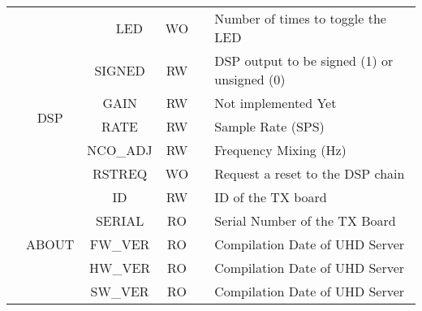 \documentclass[11pt]{article}
\begin{document}
{\begin{landscape}
\begin{table}[H]
\begin{tabular}{|c|c|c|c|c|c|l|}
                       &                         &                        & LED       & WO                &             & Number of times to toggle the LED                                     \\ \cline{2-7} 
                       & \multirow{5}{*}{DSP}    & \multicolumn{2}{c|}{SIGNED}        & RW                &             & DSP output to be signed (1) or unsigned (0)                           \\ \cline{3-7} 
                       &                         & \multicolumn{2}{c|}{GAIN}          & RW                &             & Not implemented Yet                                                   \\ \cline{3-7} 
                       &                         & \multicolumn{2}{c|}{RATE}          & RW                &             & Sample Rate (SPS)                                                     \\ \cline{3-7} 
                       &                         & \multicolumn{2}{c|}{NCO\_ADJ}      & RW                &             & Frequency Mixing (Hz)                                                 \\ \cline{3-7} 
                       &                         & \multicolumn{2}{c|}{RSTREQ}        & WO                &             & Request a reset to the DSP chain                                      \\ \cline{2-7} 
                       & \multirow{5}{*}{ABOUT}  & \multicolumn{2}{c|}{ID}            & RW                &             & ID of the TX board                                                    \\ \cline{3-7} 
                       &                         & \multicolumn{2}{c|}{SERIAL}        & RO                &             & Serial Number of the TX Board                                         \\ \cline{3-7} 
                       &                         & \multicolumn{2}{c|}{FW\_VER}       & RO                &             & Compilation Date of UHD Server                                        \\ \cline{3-7} 
                       &                         & \multicolumn{2}{c|}{HW\_VER}       & RO                &             & Compilation Date of UHD Server                                        \\ \cline{3-7} 
                       &                         & \multicolumn{2}{c|}{SW\_VER}       & RO                &             & Compilation Date of UHD Server                                        \\ \cline{2-7} 

\end{tabular}
\end{table}
\end{landscape}}
\end{document}
